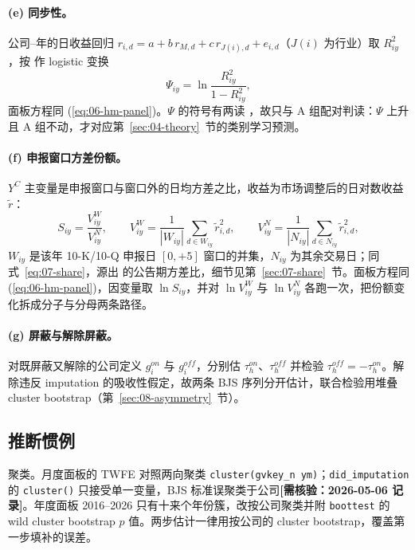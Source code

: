 \documentclass[a4paper,11pt]{ctexart}
\begin{document}
\paragraph{(e) 同步性。}
公司--年的日收益回归 $r_{i,d}=a+b\,r_{M,d}+c\,r_{J(i),d}+e_{i,d}$（$J(i)$ 为行业）取 $R^2_{iy}$，按 \citet{morckyeungyu2000} 作 logistic 变换
\begin{equation}\label{eq:06-psi}
\Psi_{iy}=\ln\frac{R^{2}_{iy}}{1-R^{2}_{iy}} ,
\end{equation}
面板方程同 (\ref{eq:06-hm-panel})。$\Psi$ 的符号有两读 \citep{roll1988}，故只与 A 组配对判读：$\Psi$ 上升且 A 组不动，才对应第~\ref{sec:04-theory}~节的类别学习预测。

\paragraph{(f) 申报窗口方差份额。}
$Y^{C}$ 主变量是申报窗口与窗口外的日均方差之比，收益为市场调整后的日对数收益 $\tilde r$：
\begin{equation}\label{eq:06-var-share}
S_{iy}=\frac{V^{W}_{iy}}{V^{N}_{iy}},\qquad
V^{W}_{iy}=\frac{1}{|W_{iy}|}\sum_{d\in W_{iy}}\tilde r_{i,d}^{2},\qquad
V^{N}_{iy}=\frac{1}{|N_{iy}|}\sum_{d\in N_{iy}}\tilde r_{i,d}^{2},
\end{equation}
$W_{iy}$ 是该年 10-K/10-Q 申报日 $[0,+5]$ 窗口的并集，$N_{iy}$ 为其余交易日；同式~\eqref{eq:07-share}，源出 \citet{beaver1968} 的公告期方差比，细节见第~\ref{sec:07-share}~节。面板方程同 (\ref{eq:06-hm-panel})，因变量取 $\ln S_{iy}$，并对 $\ln V^{W}_{iy}$ 与 $\ln V^{N}_{iy}$ 各跑一次，把份额变化拆成分子与分母两条路径。

\paragraph{(g) 屏蔽与解除屏蔽。}
对既屏蔽又解除的公司定义 $g_i^{on}$ 与 $g_i^{off}$，分别估 $\tau_h^{on}$、$\tau_h^{off}$ 并检验 $\tau_h^{off}=-\tau_h^{on}$。解除违反 imputation 的吸收性假定，故两条 BJS 序列分开估计，联合检验用堆叠 cluster bootstrap（第~\ref{sec:08-asymmetry}~节）。

\subsection{推断惯例}\label{sec:06-inference}

聚类。月度面板的 TWFE 对照两向聚类 \texttt{cluster(gvkey\_n ym)}；\texttt{did\_imputation} 的 \texttt{cluster()} 只接受单一变量，BJS 标准误聚类于公司\textbf{[需核验：2026-05-06 记录]}。年度面板 2016--2026 只有十来个年份簇，改按公司聚类并附 \texttt{boottest} 的 wild cluster bootstrap $p$ 值。两步估计一律用按公司的 cluster bootstrap，覆盖第一步填补的误差。
\end{document}
